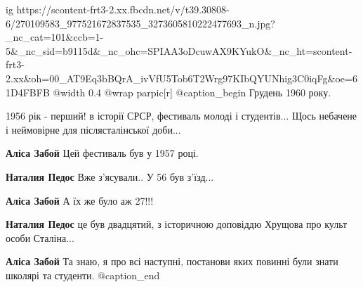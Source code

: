  
 
 
 
 

\ifcmt
  ig https://scontent-frt3-2.xx.fbcdn.net/v/t39.30808-6/270109583_977521672837535_3273605810222477693_n.jpg?_nc_cat=101&ccb=1-5&_nc_sid=b9115d&_nc_ohc=SPIAA3oDcuwAX9KYukO&_nc_ht=scontent-frt3-2.xx&oh=00_AT9Eq3bBQrA_ivVfU5Tob6T2Wrg97KIbQYUNhig3C0iqFg&oe=61D4FBFB
  @width 0.4
	@wrap parpic[r]
	@caption_begin 
		Грудень 1960 року.


1956 рік - перший! в історії СРСР, фестиваль молоді і студентів... Щось
небачене і неймовірне для післясталінської доби...

\textbf{Аліса Забой} Цей фестиваль був у 1957 році.

\textbf{Наталия Педос} Вже з'ясували..
У 56 був з'їзд...

\textbf{Аліса Забой} А їх же було аж 27!!!

\textbf{Наталия Педос} це був двадцятий, з історичною доповіддю Хрущова про культ особи Сталіна...

\textbf{Аліса Забой} Та знаю, я про всі наступні, постанови яких повинні були знати школярі та студенти.
	@caption_end
\fi
